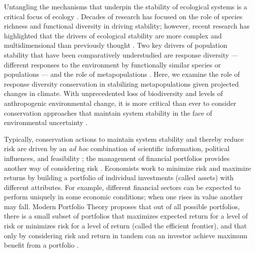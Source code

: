 \documentclass[12pt,english]{article}
\begin{document}
\begin{spacing}{1.3}
Untangling the mechanisms that underpin the stability of ecological systems is a critical focus of ecology \citep[e.g.][]{ives2007, demazancourt2013}. Decades of research has focused on the role of species richness and functional diversity in driving stability; however, recent research has highlighted that the drivers of ecological stability are more complex and multidimensional than previously thought \citep[e.g.][]{balvanera2006, ives2007, demazancourt2013}. Two key drivers of population stability that have been comparatively understudied are response diversity \citep{winfree2009, mori2013} --- different responses to the environment by functionally similar species or populations \citep{elmqvist2003} --- and the role of metapopulations \citep{schtickzelle2007}. Here, we examine the role of response diversity conservation in stabilizing metapopulations given projected changes in climate. With unprecedented loss of biodiversity and levels of anthropogenic environmental change, it is more critical than ever to consider conservation approaches that maintain system stability in the face of environmental uncertainty \citep{lee2008, ando2012}.

Typically, conservation actions to maintain system stability and thereby reduce risk are driven by an \emph{ad hoc} combination of scientific information, political influences, and feasibility \citep{margules2000}; the management of financial portfolios provides another way of considering risk \citep[e.g.][]{figge2004, koellner2006, ando2012, haak2012}. Economists work to minimize risk and maximize returns by building a portfolio of individual investments (called assets) with different attributes. For example, different financial sectors can be expected to perform uniquely in some economic conditions; when one rises in value another may fall. Modern Portfolio Theory proposes that out of all possible portfolios, there is a small subset of portfolios that maximizes expected return for a level of risk or minimizes risk for a level of return (called the efficient frontier), and that only by considering risk and return in tandem can an investor achieve maximum benefit from a portfolio \citep{markowitz1952}.


\end{spacing}
\end{document}
